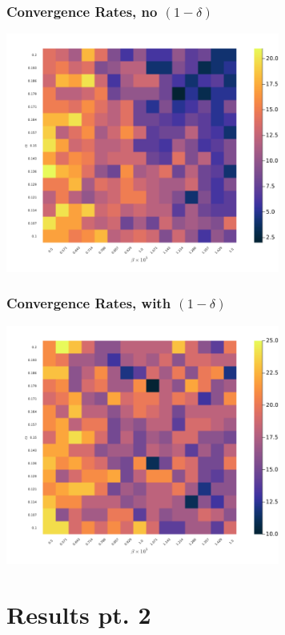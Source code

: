 \documentclass{beamer}
\begin{document}
\begin{frame}\frametitle{Convergence Rates, no $(1-\delta)$}
	\begin{center}
		\includegraphics[width=9cm]{heatmap_convergence_counts_25_nodelta.png}
	\end{center}
\end{frame}
\begin{frame}\frametitle{Convergence Rates, with $(1-\delta)$}
	\begin{center}
		\includegraphics[width=9cm]{heatmap_convergence_counts_25_delta.png}
	\end{center}
\end{frame}

\section{Results pt. 2}
\end{document}
